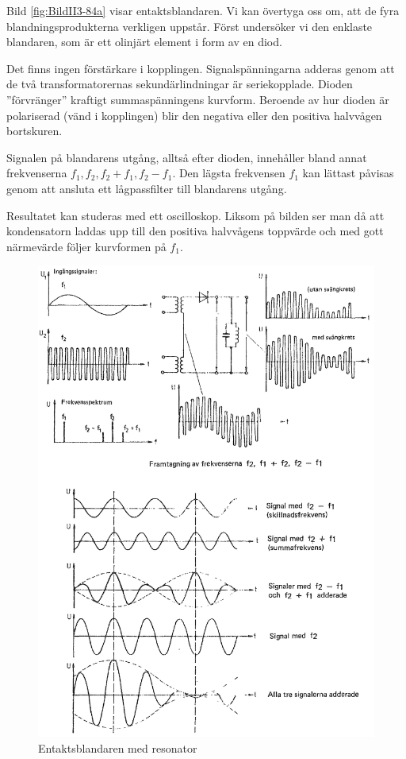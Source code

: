 Bild \ref{fig:BildII3-84a} visar entaktsblandaren.
Vi kan övertyga oss om, att de fyra blandningsprodukterna verkligen uppstår.
Först undersöker vi den enklaste blandaren, som är ett olinjärt element i form
av en diod.

Det finns ingen förstärkare i kopplingen.
Signalspänningarna adderas genom att de två transformatorernas
sekundärlindningar är seriekopplade.
Dioden ''förvränger'' kraftigt summaspänningens kurvform.
Beroende av hur dioden är polariserad (vänd i kopplingen) blir den negativa
eller den positiva halvvågen bortskuren.

Signalen på blandarens utgång, alltså efter dioden, innehåller
bland annat frekvenserna \(f_1, f_2, f_2+f_1, f_2-f_1\).
Den lägsta frekvensen \(f_1\) kan lättast påvisas genom att ansluta ett
lågpassfilter till blandarens utgång.

Resultatet kan studeras med ett oscilloskop.
Liksom på bilden ser man då att kondensatorn laddas upp till den positiva
halvvågens toppvärde och med gott närmevärde följer kurvformen på \(f_1\).

\begin{figure}
\includegraphics[width=\textwidth]{images/cropped_pdfs/bild_2_3-84b.pdf}
\caption{Entaktsblandaren med resonator}
\label{fig:BildII3-84b}
\end{figure}

